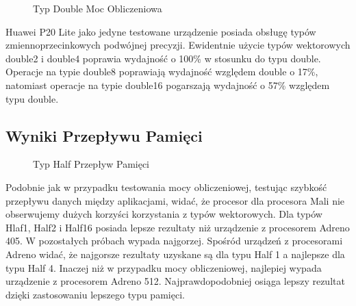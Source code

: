 \begin{figure}[H]
\caption{Typ Double Moc Obliczeniowa}
\end{figure}

Huawei P20 Lite jako jedyne testowane urządzenie posiada obsługę typów zmiennoprzecinkowych podwójnej precyzji. Ewidentnie użycie typów wektorowych double2 i double4 poprawia wydajność o 100\% w stosunku do typu double. Operacje na typie double8 poprawiają wydajność względem double o 17\%, natomiast operacje na typie double16 pogarszają wydajność o 57\% względem typu double.

\subsection[Wyniki Przepływu Pamięci]{Wyniki Przepływu Pamięci}

\begin{figure}[H]
\caption{Typ Half Przepływ Pamięci}
\end{figure}
Podobnie jak w przypadku testowania mocy obliczeniowej, testując szybkość przepływu danych między aplikacjami, widać, że procesor dla procesora Mali nie obserwujemy dużych korzyści korzystania z typów wektorowych. Dla typów Hlaf1, Half2 i Half16 posiada lepsze rezultaty niż urządzenie z procesorem Adreno 405. W pozostałych próbach wypada najgorzej. Spośród urządzeń z procesorami Adreno widać, że najgorsze rezultaty uzyskane są dla typu Half 1 a najlepsze dla typu Half 4. Inaczej niż w przypadku mocy obliczeniowej, najlepiej wypada urządzenie z procesorem Adreno 512. Najprawdopodobniej osiąga lepszy rezultat dzięki zastosowaniu lepszego typu pamięci.


